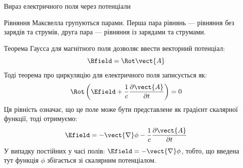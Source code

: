 \documentclass[onlytextwidth]{beamer}
\begin{document}
\begin{frame}{Вираз електричного поля через потенціали}{}
	\renewcommand{\baselinestretch}{0.99}
	\begin{block}{}\justifying
		Рівняння Максвелла групуються парами. \alert{Перша пара рівнянь} --- рівняння \alert{без зарядів та струмів}, \alert{друга пара} --- рівняння
		\alert{із зарядами та струмами}.
	\end{block}
	\begin{block}{}
		Теорема Гаусса для магнітного поля дозволяє ввести векторний потенціал:
		\begin{equation*}
			\Bfield=\Rot\vect{A}
		\end{equation*}
		Тоді теорема про циркуляцію для електричного поля записується як:
		\begin{equation*}
			\Rot\left(\Efield  + \frac1c\frac{\partial\vect{A}}{\partial t}\right) = 0
		\end{equation*}
		Ця рівність означає, що це
		поле може бути представлене як градієнт скалярної функції, тоді отримуємо:
		\begin{equation*}
			\Efield = -\vect{\nabla}\phi - \frac1c\frac{\partial\vect{A}}{\partial t}
		\end{equation*}
		У випадку постійних у часі полів: $\Efield = -\vect{\nabla}\phi $, тобто, що введена тут функція $\phi$
		збігається зі скалярним потенціалом.
	\end{block}
\end{frame}
\end{document}
